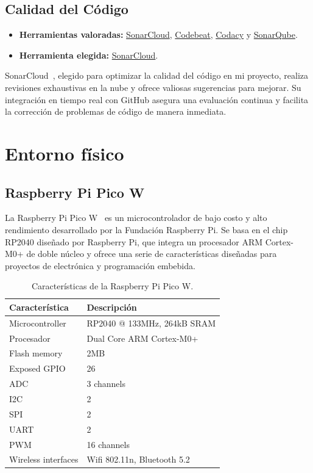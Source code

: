 \subsection{Calidad del Código}
\begin{itemize}
	\item \textbf{Herramientas valoradas:} \href{https://www.sonarsource.com/products/sonarcloud/}{SonarCloud}, \href{https://codebeat.co/}{Codebeat}, \href{https://www.codacy.com/}{Codacy} y \href{https://www.sonarsource.com/products/sonarqube/}{SonarQube}.
    \item \textbf{Herramienta elegida:} \href{https://www.sonarsource.com/products/sonarcloud/}{SonarCloud}.
\end{itemize}
SonarCloud~\cite{misc:SonarCloud}, elegido para optimizar la calidad del código en mi proyecto, realiza revisiones exhaustivas en la nube y ofrece valiosas sugerencias para mejorar. Su integración en tiempo real con GitHub asegura una evaluación continua y facilita la corrección de problemas de código de manera inmediata. 

\section{Entorno físico}
\subsection{Raspberry Pi Pico W}
La Raspberry Pi Pico W~\cite{manual:RPiPicoW_datasheet} es un microcontrolador de bajo costo y alto rendimiento desarrollado por la Fundación Raspberry Pi. Se basa en el chip RP2040 diseñado por Raspberry Pi, que integra un procesador ARM Cortex-M0+ de doble núcleo y ofrece una serie de características diseñadas para proyectos de electrónica y programación embebida.

\begin{table}[htbp]
\begin{center}
\caption{Características de la Raspberry Pi Pico W.}
\begin{tabular}{|l|l|}
\hline
\rowcolor[HTML]{C0C0C0} 
\textbf{Característica} & \textbf{Descripción}\\ \hline
Microcontroller	& RP2040 @ 133MHz, 264kB SRAM \\ \hline
Procesador & Dual Core ARM Cortex-M0+ \\ \hline
Flash memory &	2MB \\ \hline
Exposed GPIO & 26 \\ \hline
ADC	& 3 channels \\ \hline
I2C	& 2 \\ \hline
SPI	& 2 \\ \hline
UART & 2 \\ \hline
PWM	& 16 channels	 \\ \hline
Wireless interfaces & Wifi 802.11n, Bluetooth 5.2\\ \hline
\end{tabular}
\end{center}
\end{table}
\pagebreak


